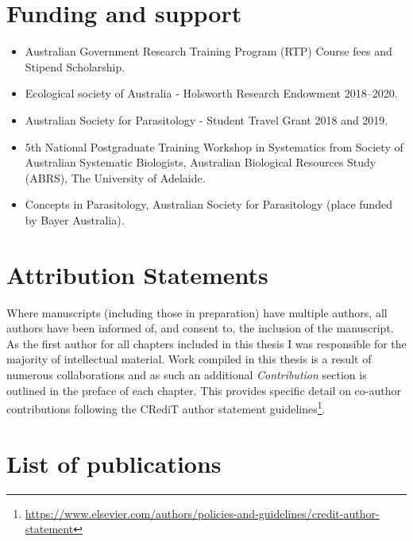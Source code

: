 \documentclass[a4paper, nobind]{templates/ociamthesis}
\providecommand{\tightlist}{%
  \setlength{\itemsep}{0pt}\setlength{\parskip}{0pt}}
\begin{document}
\hypertarget{funding-and-support}{%
\section*{Funding and support}\label{funding-and-support}}

\begin{itemize}
\tightlist
\item
  Australian Government Research Training Program (RTP) Course fees and Stipend Scholarship.
\item
  Ecological society of Australia - Holsworth Research Endowment 2018--2020.
\item
  Australian Society for Parasitology - Student Travel Grant 2018 and 2019.
\item
  5th National Postgraduate Training Workshop in Systematics from Society of Australian Systematic Biologists, Australian Biological Resources Study (ABRS), The University of Adelaide.
\item
  Concepts in Parasitology, Australian Society for Parasitology (place funded by Bayer Australia).
\end{itemize}

\hypertarget{attribution-statements}{%
\section*{Attribution Statements}\label{attribution-statements}}

Where manuscripts (including those in preparation) have multiple authors, all authors have been informed of, and consent to, the inclusion of the manuscript.
As the first author for all chapters included in this thesis I was responsible for the majority of intellectual material.
Work compiled in this thesis is a result of numerous collaborations and as such an additional \emph{Contribution} section is outlined in the preface of each chapter. This provides specific detail on co-author contributions following the CRediT author statement guidelines\footnote{\url{https://www.elsevier.com/authors/policies-and-guidelines/credit-author-statement}}.

\hypertarget{list-of-publications}{%
\section*{List of publications}\label{list-of-publications}}
\end{document}
